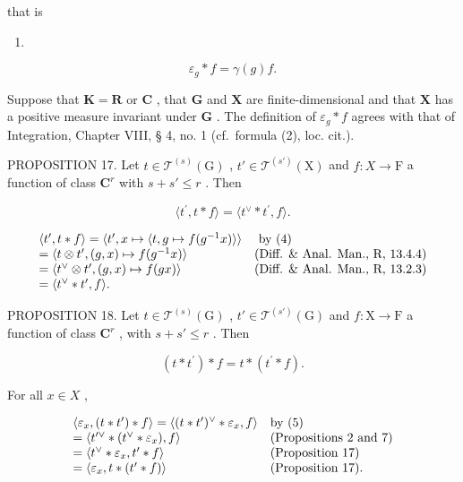 that is

\begin{enumerate}
\def\labelenumi{(\arabic{enumi})}
\setcounter{enumi}{6}
\tightlist
\item
\end{enumerate}

\[
\varepsilon_ {g} * f = \gamma (g) f.
\]

Suppose that \(\mathbf{K} = \mathbf{R}\) or \(\mathbf{C}\) , that \(\mathbf{G}\) and \(\mathbf{X}\) are finite-dimensional and that \(\mathbf{X}\) has a positive measure invariant under \(\mathbf{G}\) . The definition of \(\varepsilon_g * f\) agrees with that of Integration, Chapter VIII, § 4, no. 1 (cf.~formula (2), loc. cit.).

PROPOSITION 17. Let \(t \in \mathcal{T}^{(s)}(\mathrm{G})\) , \(t' \in \mathcal{T}^{(s')}(\mathrm{X})\) and \(f: X \to \mathrm{F}\) a function of class \(\mathbf{C}^{r}\) with \(s + s' \leqslant r\) . Then

\[
\langle t ^ {\prime}, t * f \rangle = \langle t ^ {\vee} * t ^ {\prime}, f \rangle .
\]

\[
\begin{array}{l l} \langle t ^ {\prime}, t * f \rangle = \langle t ^ {\prime}, x \mapsto \langle t, g \mapsto f (g ^ {- 1} x) \rangle \rangle & \text { by   (4) } \\ = \langle t \otimes t ^ {\prime}, (g, x) \mapsto f (g ^ {- 1} x) \rangle & \text {(Diff. \& Anal. Man., R, 13.4.4)} \\ = \langle t ^ {\vee} \otimes t ^ {\prime}, (g, x) \mapsto f (g x) \rangle & \text {(Diff. \& Anal. Man., R, 13.2.3)} \\ = \langle t ^ {\vee} * t ^ {\prime}, f \rangle . \end{array}
\]

PROPOSITION 18. Let \(t \in \mathcal{T}^{(s)}(\mathrm{G})\) , \(t' \in \mathcal{T}^{(s')}(\mathrm{G})\) and \(f: \mathrm{X} \to \mathrm{F}\) a function of class \(\mathbf{C}^r\) , with \(s + s' \leqslant r\) . Then

\[
(t * t ^ {\prime}) * f = t * (t ^ {\prime} * f).
\]

For all \(x \in X\) ,

\[
\begin{array}{l l} \langle \varepsilon_ {x}, (t * t ^ {\prime}) * f \rangle = \langle (t * t ^ {\prime}) ^ {\vee} * \varepsilon_ {x}, f \rangle & \text {by (5)} \\ = \langle t ^ {\prime \vee} * (t ^ {\vee} * \varepsilon_ {x}), f \rangle & \text {(Propositions 2 and 7)} \\ = \langle t ^ {\vee} * \varepsilon_ {x}, t ^ {\prime} * f \rangle & \text {(Proposition 17)} \\ = \langle \varepsilon_ {x}, t * (t ^ {\prime} * f) \rangle & \text {(Proposition 17).} \end{array}
\]

